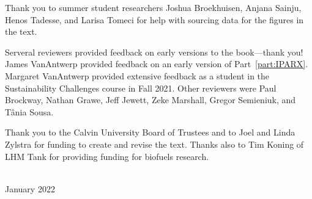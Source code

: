 Thank you to summer student researchers Joshua Broekhuisen, Anjana Sainju, 
Henos Tadesse, and Larisa Tomeci
for help with sourcing data for the figures in the text. 

Serveral reviewers provided feedback on early versions to the book---thank you!
James VanAntwerp provided feedback on an early version of Part~\ref{part:IPARX}.
Margaret VanAntwerp provided extensive feedback as a student in the
Sustainability Challenges course in Fall 2021.
Other reviewers were Paul Brockway, Nathan Grawe, Jeff Jewett, Zeke Marshall,
Gregor Semieniuk, and T\^{a}nia Sousa.


Thank you to the Calvin University Board of Trustees and 
to Joel and Linda Zylstra
for funding to create and revise the text.
Thanks also to Tim Koning of LHM Tank for providing funding for biofuels research.



\vspace*{2pc}
\noindent\AUTHORS\\
\noindent January 2022
 
\clearpage

\blankpage
